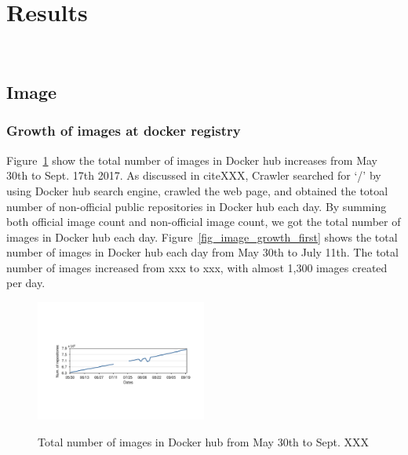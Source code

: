 
\section{Results}

\\

\subsection{Image}

\subsubsection{Growth  of images at docker registry}

Figure~\ref{fig_image_growth} show the total number of images in Docker hub increases from May 30th to Sept. 17th 2017. As discussed in citeXXX, Crawler searched for `/' by using Docker hub search engine, crawled the web page, and obtained the totoal number of non-official public repositories in Docker hub each day. By summing both official image count and non-official image count, we got the total number of images in Docker hub each day. Figure~\ref{fig_image_growth_first} shows the total number of images in Docker hub each day from May 30th to July 11th. The total number of images increased from xxx to xxx, with almost 1,300 images created per day.

\begin{figure}
  \centering
  \includegraphics[width=0.5\textwidth]{graphs/image_growth}\\
  \caption{Total number of images in Docker hub from May 30th to Sept. XXX}\label{fig_image_growth}
\end{figure}

